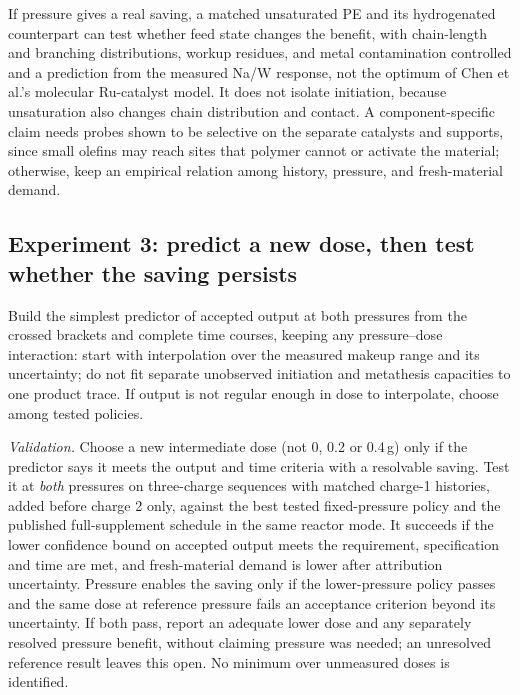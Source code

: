 If pressure gives a real saving, a matched unsaturated PE and its hydrogenated counterpart can test whether feed state changes the benefit, with chain-length and branching distributions, workup residues, and metal contamination controlled and a prediction from the measured Na/W response, not the optimum of Chen et al.'s molecular Ru-catalyst model. It does not isolate initiation, because unsaturation also changes chain distribution and contact. A component-specific claim needs probes shown to be selective on the separate catalysts and supports, since small olefins may reach sites that polymer cannot or activate the material; otherwise, keep an empirical relation among history, pressure, and fresh-material demand.

\subsection{Experiment 3: predict a new dose, then test whether the saving persists}

Build the simplest predictor of accepted output at both pressures from the crossed brackets and complete time courses, keeping any pressure--dose interaction: start with interpolation over the measured makeup range and its uncertainty; do not fit separate unobserved initiation and metathesis capacities to one product trace. If output is not regular enough in dose to interpolate, choose among tested policies.

\emph{Validation.} Choose a new intermediate dose (not 0, 0.2 or 0.4\,g) only if the predictor says it meets the output and time criteria with a resolvable saving. Test it at \emph{both} pressures on three-charge sequences with matched charge-1 histories, added before charge 2 only, against the best tested fixed-pressure policy and the published full-supplement schedule in the same reactor mode. It succeeds if the lower confidence bound on accepted output meets the requirement, specification and time are met, and fresh-material demand is lower after attribution uncertainty. Pressure enables the saving only if the lower-pressure policy passes and the same dose at reference pressure fails an acceptance criterion beyond its uncertainty. If both pass, report an adequate lower dose and any separately resolved pressure benefit, without claiming pressure was needed; an unresolved reference result leaves this open. No minimum over unmeasured doses is identified.

